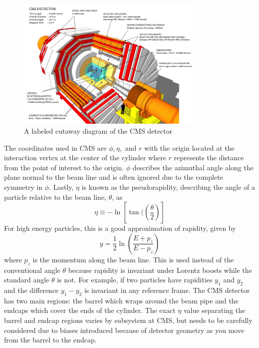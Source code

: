 \begin{figure}[htbp]
    \centering
    \includegraphics[width=0.8\textwidth]{figures/chapter3/cms-detector-cutout.png}
    \caption{A labeled cutaway diagram of the CMS detector \cite{ref:sakuma}}
    \label{fig:cms-detector-cutout.png}
\end{figure}


The coordinates used in CMS are $\phi, \eta,$ and $r$ with the origin located at the interaction vertex at the center of the cylinder where $r$ represents the distance from the point of interest to the origin. $\phi$ describes the azimuthal angle along the plane normal to the beam line and is often ignored due to the complete symmetry in $\phi$. Lastly, $\eta$ is known as the pseudorapidity, describing the angle of a particle relative to the beam line, $\theta$, as
\begin{equation}
    \eta \equiv -\ln\left[ \tan(\left(\frac{\theta}{2}\right) \right]
\end{equation}
For high energy particles, this is a good approximation of rapidity, given by
\begin{equation}
    y = \frac{1}{2} \ln\left( \frac{E + p_z}{E-p_z}\right)
\end{equation}
where $p_z$ is the momentum along the beam line. This is used instead of the conventional angle $\theta$ because rapidity is invariant under Lorentz boosts while the standard angle $\theta$ is not. For example, if two particles have rapidities $y_1$ and $y_2$ and the difference $y_1 - y_2$ is invariant in any reference frame. The CMS detector has two main regions: the barrel which wraps around the beam pipe and the endcaps which cover the ends of the cylinder. The exact $\eta$ value separating the barrel and endcap regions varies by subsystem at CMS, but needs to be carefully considered due to biases introduced because of detector geometry as you move from the barrel to the endcap. 

